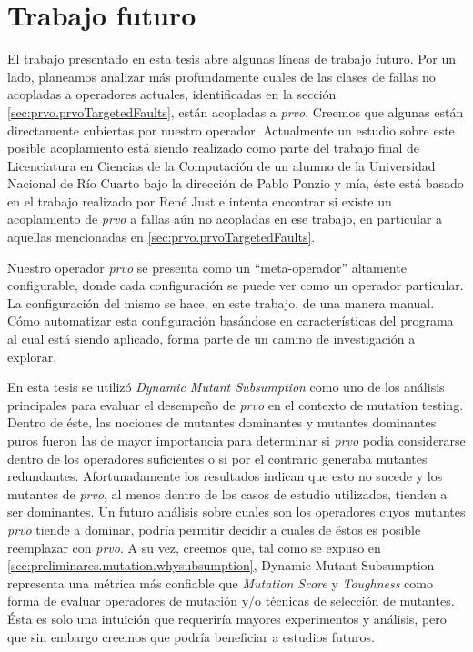 \chapter[Trabajo futuro]{Trabajo futuro}
\label{cap:futurework}

El trabajo presentado en esta tesis abre algunas l\'ineas de trabajo futuro. Por un lado, planeamos analizar m\'as profundamente cuales de las clases de fallas no acopladas a operadores actuales, identificadas en la secci\'on \ref{sec:prvo.prvoTargetedFaults}, est\'an acopladas a \emph{prvo}. Creemos que algunas est\'an directamente cubiertas por nuestro operador. Actualmente un estudio sobre este posible acoplamiento est\'a siendo realizado como parte del trabajo final de Licenciatura en Ciencias de la Computaci\'on de un alumno de la Universidad Nacional de R\'io Cuarto bajo la direcci\'on de Pablo Ponzio y m\'ia, \'este est\'a basado en el trabajo realizado por Ren\'e Just \cite{bibliography.mutation.evaluation.valid-substitute} e intenta encontrar si existe un acoplamiento de \emph{prvo} a fallas a\'un no acopladas en ese trabajo, en particular a aquellas mencionadas en \ref{sec:prvo.prvoTargetedFaults}.

Nuestro operador \emph{prvo} se presenta como un ``meta-operador'' altamente configurable, donde cada configuraci\'on se puede ver como un operador particular. La configuraci\'on del mismo se hace, en este trabajo, de una manera manual. C\'omo automatizar esta configuraci\'on bas\'andose en caracter\'isticas del programa al cual est\'a siendo aplicado, forma parte de un camino de investigaci\'on a explorar.

En esta tesis se utiliz\'o \emph{Dynamic Mutant Subsumption} como uno de los an\'alisis principales para evaluar el desempe\~no de \emph{prvo} en el contexto de mutation testing. Dentro de \'este, las nociones de mutantes dominantes y mutantes dominantes puros fueron las de mayor importancia para determinar si \emph{prvo} pod\'ia considerarse dentro de los operadores suficientes o si por el contrario generaba mutantes redundantes. Afortunadamente los resultados indican que esto no sucede y los mutantes de \emph{prvo}, al menos dentro de los casos de estudio utilizados, tienden a ser dominantes. Un futuro an\'alisis sobre cuales son los operadores cuyos mutantes \emph{prvo} tiende a dominar, podr\'ia permitir decidir a cuales de \'estos es posible reemplazar con \emph{prvo}. A su vez, creemos que, tal como se expuso en \ref{sec:preliminares.mutation.whysubsumption}, Dynamic Mutant Subsumption representa una m\'etrica m\'as confiable que \emph{Mutation Score} y \emph{Toughness} como forma de evaluar operadores de mutaci\'on y/o t\'ecnicas de selecci\'on de mutantes. \'Esta es solo una intuici\'on que requerir\'ia mayores experimentos y an\'alisis, pero que sin embargo creemos que podr\'ia beneficiar a estudios futuros. 


